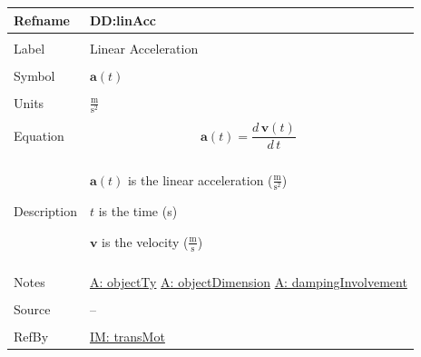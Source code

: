 \documentclass[12pt]{article}
\begin{document}
\noindent \begin{minipage}{\textwidth}
\begin{tabular}{p{} p{}}
\toprule \textbf{Refname} & \textbf{DD:linAcc}
\label{DD:linAcc}
\\ \midrule \\
Label & Linear Acceleration
\\ \midrule \\
Symbol & $\mathbf{a}(t)$
\\ \midrule \\
Units & $\frac{\text{m}}{\text{s}^{2}}$
\\ \midrule \\
Equation & \begin{displaymath}
           \mathbf{a}(t)=\frac{d\,\mathbf{v}\left(t\right)}{d\,t}
           \end{displaymath}
\\ \midrule \\
Description & \begin{symbDescription}
              \item{$\mathbf{a}(t)$ is the linear acceleration ($\frac{\text{m}}{\text{s}^{2}}$)}
              \item{$t$ is the time (s)}
              \item{$\mathbf{v}$ is the velocity ($\frac{\text{m}}{\text{s}}$)}
              \end{symbDescription}
\\ \midrule \\
Notes & \hyperref[assumpOT]{A: objectTy}
        \hyperref[assumpOD]{A: objectDimension}
        \hyperref[assumpDI]{A: dampingInvolvement}
\\ \midrule \\
Source & --
\\ \midrule \\
RefBy & \hyperref[IM:transMot]{IM: transMot}
\\ \bottomrule \end{tabular}
\end{minipage}
\par~
\end{document}
